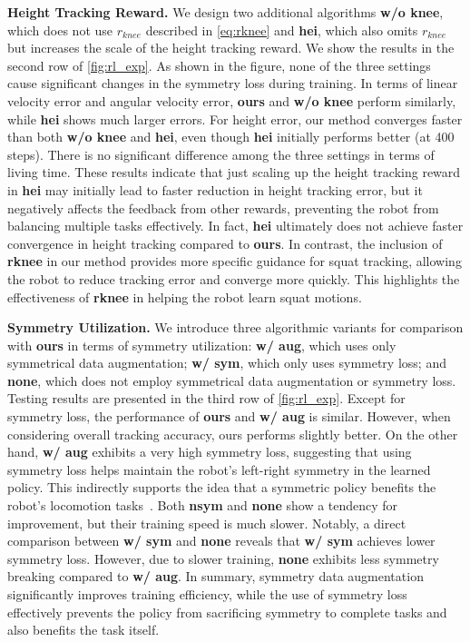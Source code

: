\textbf{Height Tracking Reward.} We design two additional algorithms \textbf{w/o knee}, which does not use $r_{knee}$ described in \cref{eq:rknee} and \textbf{hei}, which also omits $r_{knee}$ but increases the scale of the height tracking reward. We show the results in the second row of \cref{fig:rl_exp}. As shown in the figure, none of the three settings cause significant changes in the symmetry loss during training. In terms of linear velocity error and angular velocity error, \textbf{ours} and \textbf{w/o knee} perform similarly, while \textbf{hei} shows much larger errors. For height error, our method converges faster than both \textbf{w/o knee} and \textbf{hei}, even though \textbf{hei} initially performs better (at 400 steps). There is no significant difference among the three settings in terms of living time. These results indicate that just scaling up the height tracking reward in \textbf{hei} may initially lead to faster reduction in height tracking error, but it negatively affects the feedback from other rewards, preventing the robot from balancing multiple tasks effectively. In fact, \textbf{hei} ultimately does not achieve faster convergence in height tracking compared to \textbf{ours}. In contrast, the inclusion of \textbf{rknee} in our method provides more specific guidance for squat tracking, allowing the robot to reduce tracking error and converge more quickly. This highlights the effectiveness of \textbf{rknee} in helping the robot learn squat motions. 

\textbf{Symmetry Utilization.} We introduce three algorithmic variants for comparison with \textbf{ours} in terms of symmetry utilization:  \textbf{w/ aug}, which uses only symmetrical data augmentation; \textbf{w/ sym}, which only uses symmetry loss; and \textbf{none}, which does not employ symmetrical data augmentation or symmetry loss. Testing results are presented in the third row of \cref{fig:rl_exp}. Except for symmetry loss, the performance of \textbf{ours} and \textbf{w/ aug} is similar. However, when considering overall tracking accuracy, ours performs slightly better. On the other hand, \textbf{w/ aug} exhibits a very high symmetry loss, suggesting that using symmetry loss helps maintain the robot's left-right symmetry in the learned policy. This indirectly supports the idea that a symmetric policy benefits the robot’s locomotion tasks~\cite{su2024leveraging}. Both \textbf{nsym} and \textbf{none} show a tendency for improvement, but their training speed is much slower. Notably, a direct comparison between \textbf{w/ sym} and \textbf{none} reveals that \textbf{w/ sym} achieves lower symmetry loss. However, due to slower training, \textbf{none} exhibits less symmetry breaking compared to \textbf{w/ aug}. In summary, symmetry data augmentation significantly improves training efficiency, while the use of symmetry loss effectively prevents the policy from sacrificing symmetry to complete tasks and also benefits the task itself.

